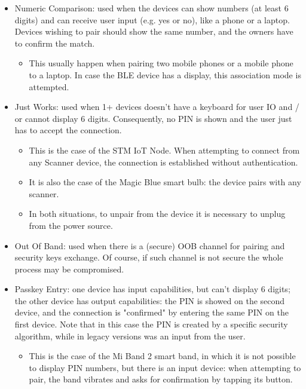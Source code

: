 \begin{itemize}
	\item Numeric Comparison: used when the devices can show numbers (at least 6 digits) and can receive user input (e.g. yes or no), like a phone or a laptop. Devices wishing to pair should show the same number, and the owners have to confirm the match.
	\begin{itemize}
		\item This usually happen when pairing two mobile phones or a mobile phone to a laptop. In case the BLE device has a display, this association mode is attempted.
	\end{itemize}
	\item Just Works: used when 1+ devices doesn't have a keyboard for user IO and / or cannot display 6 digits. Consequently, no PIN is shown and the user just has to accept the connection.
	\begin{itemize}
		\item This is the case of the STM IoT Node. When attempting to connect from any Scanner device, the connection is established without authentication.
		\item It is also the case of the Magic Blue smart bulb: the device pairs with any scanner.
		\item In both situations, to unpair from the device it is necessary to unplug from the power source.
	\end{itemize}
	\item Out Of Band: used when there is a (secure) OOB channel for pairing and security keys exchange. Of course, if such channel is not secure the whole process may be compromised.
	\item Passkey Entry: one device has input capabilities, but can't display 6 digits; the other device has output capabilities: the PIN is showed on the second device, and the connection is "confirmed" by entering the same PIN on the first device. Note that in this case the PIN is created by a specific security algorithm, while in legacy versions was an input from the user.
	\begin{itemize}
		\item This is the case of the Mi Band 2 smart band, in which it is not possible to display PIN numbers, but there is an input device: when attempting to pair, the band vibrates and asks for confirmation by tapping its button.
	\end{itemize}
\end{itemize}

